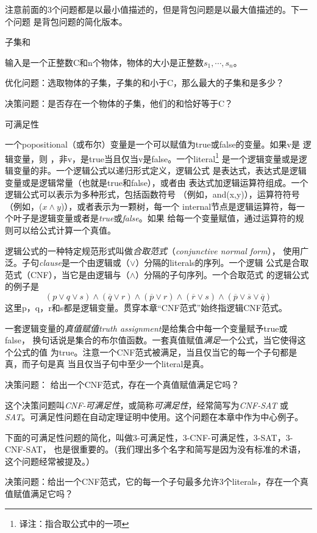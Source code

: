 注意前面的3个问题都是以最小值描述的，但是背包问题是以最大值描述的。下一个问题
是背包问题的简化版本。

\begin{problem}
子集和

输入是一个正整数C和n个物体，物体的大小是正整数$s_1, \cdots, s_n$。

优化问题：选取物体的子集，子集的和小于C，那么最大的子集和是多少？

决策问题：是否存在一个物体的子集，他们的和恰好等于C？
\end{problem}

\begin{problem}
可满足性

一个popositional（或布尔）变量是一个可以赋值为true或false的变量。如果v是
逻辑变量，则 ，非v，是true当且仅当v是false。一个literal\footnote{译注：指合取公式中的一项}
是一个逻辑变量或是逻辑变量的非。一个逻辑公式以递归形式定义，逻辑公式
是表达式，表达式是逻辑变量或是逻辑常量（也就是true和false），或者由
表达式加逻辑运算符组成。一个逻辑公式可以表示为多种形式，包括函数符号
（例如，and(x,y)），运算符符号（例如，($x\wedge y$)），或者表示为一颗树，每一个
internal节点是逻辑运算符，每一个叶子是逻辑变量或者是\emph{true}或\emph{false}。如果
给每一个变量赋值，通过运算符的规则可以给公式计算一个真值。

逻辑公式的一种特定规范形式叫做\emph{合取范式}（\emph{conjunctive normal form}），
使用广泛。子句\emph{clause}是一个由逻辑或（$\vee$）分隔的literals的序列。一个逻辑
公式是合取范式（CNF），当它是由逻辑与（$\wedge$）分隔的子句序列。一个合取范式
的逻辑公式的例子是
\begin{displaymath}
(p\vee q \vee s)\wedge (\overline{q} \vee r) \wedge (\overline{p} \vee r) \wedge (\overline{r} \vee s) \wedge (\overline{p} \vee \overline{s} \vee \overline{q})
\end{displaymath}
这里p，q，r和s都是逻辑变量。贯穿本章“CNF范式”始终指逻辑CNF范式。

一套逻辑变量的\emph{真值赋值truth assignment}是给集合中每一个变量赋予true或false，
换句话说是集合的布尔值函数。一套真值赋值\emph{满足}一个公式，当它使得这个公式的值
为true。注意一个CNF范式被满足，当且仅当它的每一个子句都是真，而子句是真
当且仅当子句中至少一个literal是真。

决策问题： 给出一个CNF范式，存在一个真值赋值满足它吗？

这个决策问题叫\emph{CNF-可满足性}，或简称\emph{可满足性}，经常简写为\emph{CNF-SAT}
或\emph{SAT}。可满足性问题在自动定理证明中使用。这个问题在本章中作为中心例子。

下面的可满足性问题的简化，叫做3-可满足性，3-CNF-可满足性，3-SAT，3-CNF-SAT，
也是很重要的。（我们理出多个名字和简写是因为没有标准的术语，这个问题经常被提及。）

决策问题：给出一个CNF范式，它的每一个子句最多允许3个literals，存在一个真值赋值满足它吗？
\end{problem}

